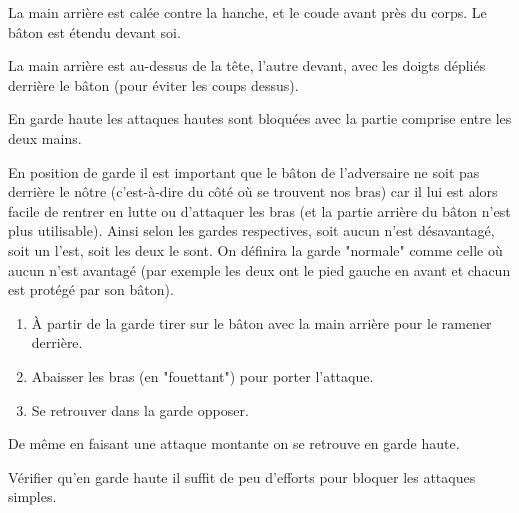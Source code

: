 \begin{garde}

La main arrière est calée contre la hanche, et le coude avant près du corps.
Le bâton est étendu devant soi.
\end{garde}


\begin{garde}

La main arrière est au-dessus de la tête, l'autre devant, avec les doigts dépliés derrière le bâton (pour éviter les coups dessus).
\end{garde}


En garde haute les attaques hautes sont bloquées avec la partie comprise entre les deux mains.

En position de garde il est important que le bâton de l'adversaire ne soit pas derrière le nôtre (c'est-à-dire du côté où se trouvent nos bras) car il lui est alors facile de rentrer en lutte ou d'attaquer les bras (et la partie arrière du bâton n'est plus utilisable).
Ainsi selon les gardes respectives, soit aucun n'est désavantagé, soit un l'est, soit les deux le sont.
On définira la garde "normale" comme celle où aucun n'est avantagé (par exemple les deux ont le pied gauche en avant et chacun est protégé par son bâton).


\begin{exercice}


\begin{enumerate}
	\item À partir de la garde tirer sur le bâton avec la main arrière pour le ramener derrière.
	
	\item Abaisser les bras (en "fouettant") pour porter l'attaque.
	
	\item Se retrouver dans la garde opposer.
\end{enumerate}

De même en faisant une attaque montante on se retrouve en garde haute.
\end{exercice}


\begin{exercice}

Vérifier qu'en garde haute il suffit de peu d'efforts pour bloquer les attaques simples.
\end{exercice}
